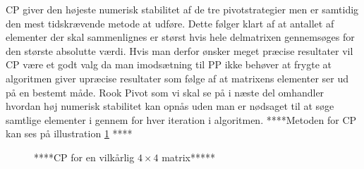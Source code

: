 \documentclass{article}
\begin{document}
CP giver den højeste numerisk stabilitet af de tre pivotstrategier men er samtidig den mest tidskrævende metode at udføre. Dette følger klart af at antallet af elementer der skal sammenlignes er størst hvis hele delmatrixen gennemsøges for den største absolutte værdi. Hvis man derfor ønsker meget præcise resultater vil CP være et godt valg da man imodsætning til PP ikke behøver at frygte at algoritmen giver upræcise resultater som følge af at matrixens elementer ser ud på en bestemt måde. Rook Pivot som vi skal se på i næste del omhandler hvordan høj numerisk stabilitet kan opnås uden man er nødsaget til at søge samtlige elementer i gennem for hver iteration i algoritmen.
\newline\newline
****Metoden for CP kan ses på illustration \ref{fig:complete} ****
\newline\newline

\begin{figure}
\caption{****CP for en vilkårlig $4 \times 4$ matrix*****}
\label{fig:complete}
\end{figure}
\end{document}
